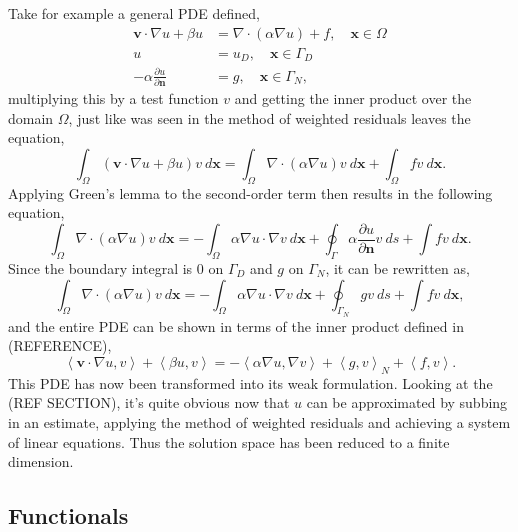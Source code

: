 Take for example a general PDE defined,
\begin{align}
	\mathbf{v}\cdot\nabla u + \beta u &= \nabla\cdot(\alpha\nabla u) + f,\quad  \mathbf{x} \in \Omega \\
	u &= u_D,\quad \mathbf{x} \in \Gamma_D\\
	-\alpha\frac{\partial u}{\partial \mathbf{n}} &= g,\quad \mathbf{x} \in \Gamma_N,
\end{align}
multiplying this by a test function $v$ and getting the inner product over the domain $\Omega$, just like was seen in the method of weighted residuals leaves the equation,
\begin{equation}
		\int_{\Omega}(\mathbf{v}\cdot\nabla u + \beta u)v~d\mathbf{x} = \int_{\Omega}\nabla\cdot(\alpha\nabla u)v~d\mathbf{x} + \int_{\Omega}fv~d\mathbf{x}.
\end{equation}
Applying Green's lemma to the second-order term then results in the following equation,
\begin{equation}
	\int_{\Omega}\nabla\cdot(\alpha\nabla u)v~d\mathbf{x} = -\int_{\Omega}\alpha\nabla u\cdot \nabla v~d\mathbf{x} + \oint_{\Gamma} \alpha \frac{\partial u}{\partial \mathbf{n}} v~ds + \int fv~d\mathbf{x}.
\end{equation}
Since the boundary integral is $0$ on $\Gamma_D$ and $g$ on $\Gamma_N$, it can be rewritten as,
\begin{equation}
	\int_{\Omega}\nabla\cdot(\alpha\nabla u)v~d\mathbf{x} = -\int_{\Omega}\alpha\nabla u\cdot \nabla v~d\mathbf{x} + \oint_{\Gamma_N} gv~ds + \int fv~d\mathbf{x},
\end{equation}
and the entire PDE can be shown in terms of the inner product defined in (REFERENCE),
\begin{equation}
	\left\langle\mathbf{v}\cdot\nabla u,v\right\rangle + \left\langle\beta u,v\right\rangle = -\left\langle\alpha\nabla u, \nabla v\right\rangle + \left\langle g,v\right\rangle_N + \left\langle f,v\right\rangle.
\end{equation}
This PDE has now been transformed into its weak formulation. Looking at the (REF SECTION), it's quite obvious now that $u$ can be approximated by subbing in an estimate, applying the method of weighted residuals and achieving a system of linear equations. Thus the solution space has been reduced to a finite dimension.

\subsection{Functionals}

